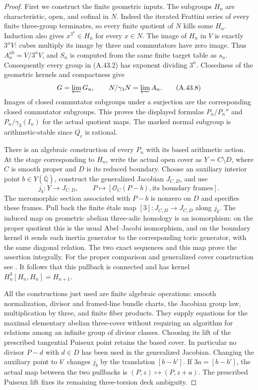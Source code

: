 \begin{proof}
First we construct the finite geometric inputs. The subgroups
$H_n$ are characteristic, open, and cofinal in $N$. Indeed
the iterated Frattini series of every finite three-group
terminates, so every finite quotient of $N$ kills some $H_n$.
Induction also gives $x^{3^n}\in H_n$ for every $x\in N$.
The image of $H_n$ in $V$ is exactly $3^nV$: cubes
multiply its image by three and commutators have zero
image. Thus $A_n^{\mathrm{ab}}=V/3^nV$, and $S_n$ is
computed from the same finite target table as $s_n$.
Consequently every group in (A.43.2) has exponent dividing
$3^n$. Closedness of the geometric kernels and compactness
give
\[
              G=\varprojlim G_n,
       \qquad N/\gamma_3N=\varprojlim A_n.
 \tag{A.43.8}
\]
Images of closed commutator subgroups under a surjection
are the corresponding closed commutator subgroups. This
proves the displayed formulas $P_n/P_n''$ and
$P_n/\gamma_3(I_n)$ for the actual quotient maps. The marked
normal subgroup is arithmetic-stable since $Q_c$ is rational.

There is an algebraic construction of every $P_n$ with its
based arithmetic action. At the stage corresponding to
$H_n$, write the actual open cover as $Y=C\setminus D$,
where $C$ is smooth proper and $D$ is its reduced boundary.
Choose an auxiliary interior point $b\in Y(\overline{\mathbb Q})$,
construct the generalized Jacobian $J_{C,D}$, and use
\[
       j_b:Y\longrightarrow J_{C,D},\qquad
       P\longmapsto[\mathcal O_C(P-b),\text{its boundary frames}].
\]
The meromorphic section associated with $P-b$ is nonzero
on $D$ and specifies these frames. Pull back the finite
\'etale map $[3]:J_{C,D}\to J_{C,D}$ along $j_b$.
The induced map on geometric abelian three-adic homology
is an isomorphism: on the proper quotient this is the
usual Abel--Jacobi isomorphism, and on the boundary kernel
it sends each inertia generator to the corresponding
toric generator, with the same diagonal relation. The
two exact sequences and this map prove the assertion
integrally. For the proper comparison and generalized
cover construction see \cite[Chapter~III, Propositions~9.1
and~9.7]{AMilneAV}. It follows that this pullback is
connected and has kernel $H_n^3[H_n,H_n]=H_{n+1}$.

All the constructions just used are finite algebraic
operations: smooth normalization, divisor and framed-line
bundle charts, the Jacobian group law, multiplication by
three, and finite fiber products. They supply equations
for the maximal elementary abelian three-cover without
requiring an algorithm for relations among an infinite
group of divisor classes. Choosing its lift of the
prescribed tangential Puiseux point retains the based
cover. In particular no divisor $P-d$ with $d\in D$ has
been used in the generalized Jacobian. Changing the
auxiliary point to $b'$ changes $j_b$ by the translation
$[b-b']$. If $3a=[b-b']$, the actual map between the two
pullbacks is $(P,z)\mapsto(P,z+a)$. The prescribed Puiseux
lift fixes its remaining three-torsion deck ambiguity.


\end{proof}
